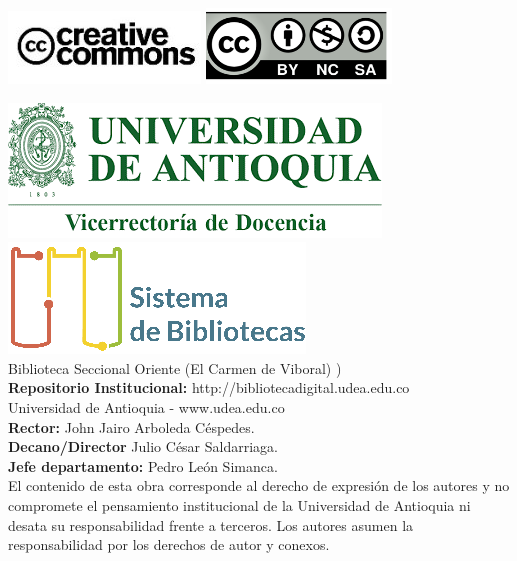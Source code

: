 \vspace{-1.1cm}\includegraphics{imagenes/CC.jpg}\quad
\includegraphics{imagenes/CCima.png}

\vspace{1cm}
%   
\includegraphics[scale=0.35]{imagenes/escudo_udea_vice.png}\quad
\includegraphics{imagenes/sis_biblo.png}\\
%
Biblioteca Seccional Oriente (El Carmen de Viboral) ) \\[1cm]
%
\textbf{Repositorio Institucional:} http://bibliotecadigital.udea.edu.co\\[1cm]
%
Universidad de Antioquia - www.udea.edu.co\\[0.5cm]
\textbf{Rector:} John Jairo Arboleda Céspedes.\\
\textbf{Decano/Director} Julio César Saldarriaga.\\
\textbf{Jefe departamento:} Pedro León Simanca.\\[1cm]
%
El contenido de esta obra corresponde al derecho de expresión de los autores y no compromete el pensamiento institucional de la Universidad de Antioquia ni desata su responsabilidad frente a terceros. Los autores asumen la responsabilidad por los derechos de autor y conexos.




